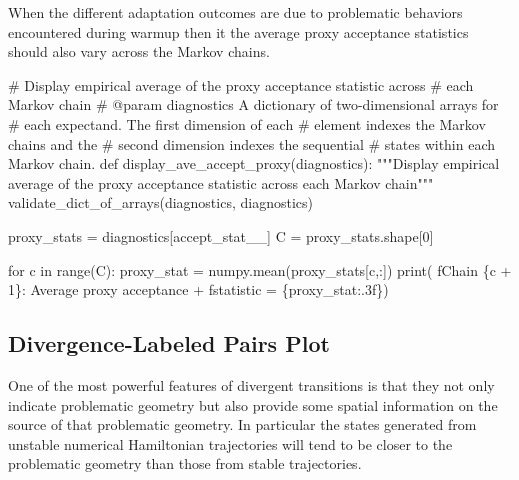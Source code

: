 \documentclass[
  letterpaper,
  DIV=11,
  numbers=noendperiod]{scrartcl}
\newenvironment{Shaded}{\begin{snugshade}}{\end{snugshade}}
\newcommand{\BuiltInTok}[1]{\textcolor[rgb]{0.00,0.23,0.31}{#1}}
\newcommand{\CommentTok}[1]{\textcolor[rgb]{0.37,0.37,0.37}{#1}}
\newcommand{\ControlFlowTok}[1]{\textcolor[rgb]{0.00,0.23,0.31}{#1}}
\newcommand{\DecValTok}[1]{\textcolor[rgb]{0.68,0.00,0.00}{#1}}
\newcommand{\KeywordTok}[1]{\textcolor[rgb]{0.00,0.23,0.31}{#1}}
\newcommand{\NormalTok}[1]{\textcolor[rgb]{0.00,0.23,0.31}{#1}}
\newcommand{\OperatorTok}[1]{\textcolor[rgb]{0.37,0.37,0.37}{#1}}
\newcommand{\SpecialCharTok}[1]{\textcolor[rgb]{0.37,0.37,0.37}{#1}}
\newcommand{\SpecialStringTok}[1]{\textcolor[rgb]{0.13,0.47,0.30}{#1}}
\newcommand{\StringTok}[1]{\textcolor[rgb]{0.13,0.47,0.30}{#1}}
\begin{document}
When the different adaptation outcomes are due to problematic behaviors
encountered during warmup then it the average proxy acceptance
statistics should also vary across the Markov chains.

\begin{Shaded}
\begin{Highlighting}[]
\CommentTok{\# Display empirical average of the proxy acceptance statistic across}
\CommentTok{\# each Markov chain}
\CommentTok{\# @param diagnostics A dictionary of two{-}dimensional arrays for}
\CommentTok{\#                    each expectand.  The first dimension of each}
\CommentTok{\#                    element indexes the Markov chains and the}
\CommentTok{\#                    second dimension indexes the sequential}
\CommentTok{\#                    states within each Markov chain.}
\KeywordTok{def}\NormalTok{ display\_ave\_accept\_proxy(diagnostics):}
  \CommentTok{"""Display empirical average of the proxy acceptance statistic}
\CommentTok{     across each Markov chain"""}
\NormalTok{  validate\_dict\_of\_arrays(diagnostics, }\StringTok{\textquotesingle{}diagnostics\textquotesingle{}}\NormalTok{)}

\NormalTok{  proxy\_stats }\OperatorTok{=}\NormalTok{ diagnostics[}\StringTok{\textquotesingle{}accept\_stat\_\_\textquotesingle{}}\NormalTok{]}
\NormalTok{  C }\OperatorTok{=}\NormalTok{ proxy\_stats.shape[}\DecValTok{0}\NormalTok{]}
  
  \ControlFlowTok{for}\NormalTok{ c }\KeywordTok{in} \BuiltInTok{range}\NormalTok{(C):}
\NormalTok{    proxy\_stat }\OperatorTok{=}\NormalTok{ numpy.mean(proxy\_stats[c,:])}
    \BuiltInTok{print}\NormalTok{(  }\SpecialStringTok{f\textquotesingle{}Chain }\SpecialCharTok{\{}\NormalTok{c }\OperatorTok{+} \DecValTok{1}\SpecialCharTok{\}}\SpecialStringTok{: Average proxy acceptance \textquotesingle{}}
          \OperatorTok{+} \SpecialStringTok{f\textquotesingle{}statistic = }\SpecialCharTok{\{}\NormalTok{proxy\_stat}\SpecialCharTok{:.3f\}}\SpecialStringTok{\textquotesingle{}}\NormalTok{)}
\end{Highlighting}
\end{Shaded}

\subsection{Divergence-Labeled Pairs
Plot}\label{divergence-labeled-pairs-plot}

One of the most powerful features of divergent transitions is that they
not only indicate problematic geometry but also provide some spatial
information on the source of that problematic geometry. In particular
the states generated from unstable numerical Hamiltonian trajectories
will tend to be closer to the problematic geometry than those from
stable trajectories.
\end{document}
